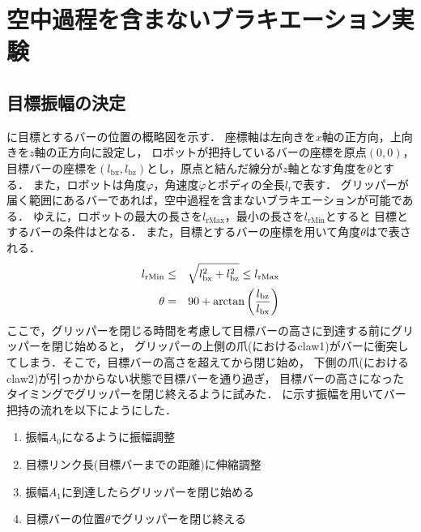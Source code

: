         \section{空中過程を含まないブラキエーション実験}

        \subsection{目標振幅の決定}
        に目標とするバーの位置の概略図を示す．
        座標軸は左向きを$x$軸の正方向，上向きを$z$軸の正方向に設定し，
        ロボットが把持しているバーの座標を原点$(0,0)$，
        目標バーの座標を$(l_{\mathrm{bx}},l_{\mathrm{bz}})$とし，原点と結んだ線分が$z$軸となす角度を$\theta$とする．
        また，ロボットは角度$\varphi$，角速度$\dot{\varphi}$とボディの全長$l_{\mathrm{r}}$で表す．
        グリッパーが届く範囲にあるバーであれば，空中過程を含まないブラキエーションが可能である．
        ゆえに，ロボットの最大の長さを$l_{\mathrm{rMax}}$，最小の長さを$l_{\mathrm{rMin}}$とすると
        目標とするバーの条件はとなる．
        また，目標とするバーの座標を用いて角度$\theta$はで表される．
        \begin{eqnarray}
                \equlabel{barRange}
                l_{\mathrm{rMin}} &\le& \sqrt{l_{\mathrm{bx}}^2+l_{\mathrm{bz}}^2} \le l_{\mathrm{rMax}}\\
                \equlabel{theta}
                \theta&=&90+\arctan{\left(\frac{l_{\mathrm{bz}}}{l_{\mathrm{bx}}}\right)}
                \end{eqnarray}  
        ここで，グリッパーを閉じる時間を考慮して目標バーの高さに到達する前にグリッパーを閉じ始めると，
        グリッパーの上側の爪(におけるclaw1)がバーに衝突してしまう．そこで，目標バーの高さを超えてから閉じ始め，
        下側の爪(におけるclaw2)が引っかからない状態で目標バーを通り過ぎ，
        目標バーの高さになったタイミングでグリッパーを閉じ終えるように試みた．
        に示す振幅を用いてバー把持の流れを以下にようにした．
        \begin{enumerate}
                \item 振幅$A_0$になるように振幅調整
                \item 目標リンク長(目標バーまでの距離)に伸縮調整
                \item 振幅$A_1$に到達したらグリッパーを閉じ始める
                \item 目標バーの位置$\theta$でグリッパーを閉じ終える
        \end{enumerate}      
